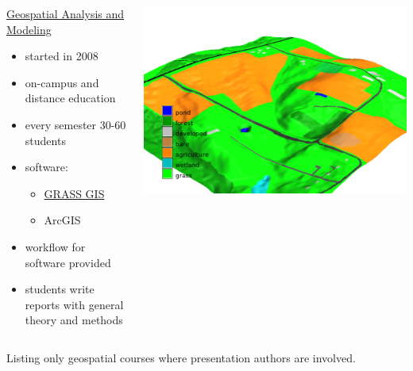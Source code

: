 \documentclass[xcolor={dvipsnames,usenames},beamer]{beamer}
\begin{document}
\begin{frame}{\coursesTitle}

\begin{columns}[c]


\begin{block}{\href{http://courses.ncsu.edu/gis582/common/}%
  {Geospatial Analysis and Modeling}}
\begin{itemize}
 \item started in 2008
 \item on-campus and distance education
 \item every semester 30-60 students
 \item software:
 \begin{itemize}
   \item \href{http://grass.osgeo.org}{GRASS GIS}
   \item ArcGIS
 \end{itemize}
 \item workflow for software provided
 \item students write reports with general theory and methods
\end{itemize}
\end{block}


\includegraphics[width=\textwidth]{./images/edu/secref}%

\end{columns}

\bigskip

Listing only geospatial courses where presentation authors are involved.

\end{frame}
\end{document}

